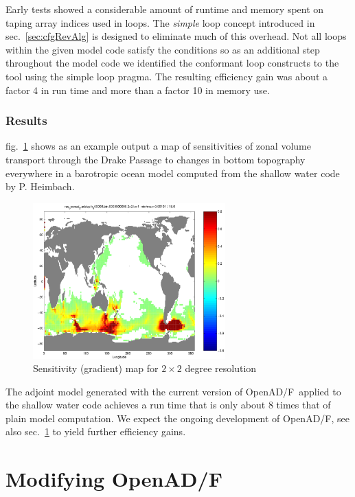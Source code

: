\documentclass{book}
\newcommand{\OpenADF}{OpenAD/F}
\newcommand{\refsec}[1]{{sec.~\ref{#1}}}
\newcommand{\reffig}[1]{{fig.~\ref{#1}}}
\begin{document}
Early tests showed a considerable amount of runtime and memory 
spent on taping array indices used in loops. 
The {\em simple} loop concept introduced in \refsec{sec:cfgRevAlg}
is designed to eliminate much of this overhead. 
Not all loops within the given model code satisfy the conditions 
so as an additional step throughout the model code 
we identified the conformant loop constructs to 
the tool using the simple loop pragma. The resulting efficiency gain
was about a factor 4 in run time and more than a factor 10 in memory 
use.

\subsection{Results}
\reffig{fig:sensMap} shows as an example output a map of sensitivities of 
zonal volume transport through the Drake Passage 
to changes in bottom topography everywhere in a barotropic ocean model 
computed from the shallow water code by P. Heimbach.
\begin{figure}
\begin{center}
\includegraphics[height=6cm]{sensMap}
\end{center}
\caption{Sensitivity (gradient) map for $2\times 2$ degree resolution}\label{fig:sensMap}
\end{figure} 
The adjoint model generated with the current version of \OpenADF\ applied to the 
shallow water code achieves 
a run time that is only about 8 times that of  plain model computation.
We expect the ongoing development of \OpenADF, see also \refsec{sec:mods} to yield 
further efficiency gains.

\chapter{Modifying \OpenADF}\label{sec:mods}
\end{document}
